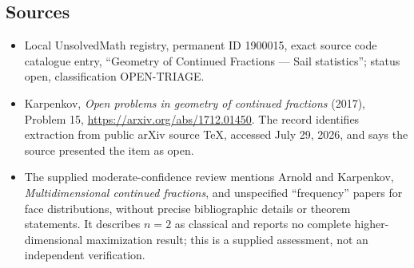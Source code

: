 \documentclass[11pt]{article}
\begin{document}
\subsection{Sources}
\begin{itemize}
\item Local UnsolvedMath registry, permanent ID 1900015, exact source code catalogue entry, ``Geometry of Continued Fractions --- Sail statistics''; status open, classification OPEN-TRIAGE.
\item Karpenkov, \emph{Open problems in geometry of continued fractions} (2017), Problem 15, \url{https://arxiv.org/abs/1712.01450}. The record identifies extraction from public arXiv source TeX, accessed July 29, 2026, and says the source presented the item as open.
\item The supplied moderate-confidence review mentions Arnold and Karpenkov, \emph{Multidimensional continued fractions}, and unspecified ``frequency'' papers for face distributions, without precise bibliographic details or theorem statements. It describes $n=2$ as classical and reports no complete higher-dimensional maximization result; this is a supplied assessment, not an independent verification.
\end{itemize}
\end{document}

